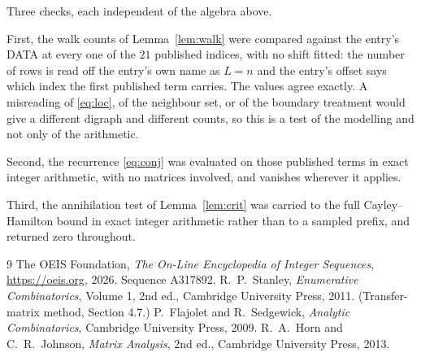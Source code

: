 \documentclass[11pt,a4paper]{article}
\theoremstyle{plain}
\theoremstyle{definition}
\begin{document}
Three checks, each independent of the algebra above.

First, the walk counts of Lemma~\ref{lem:walk} were compared against the entry's DATA at
every one of the $21$ published indices, with no shift fitted: the number of rows is
read off the entry's own name as $L=n$ and the entry's offset says which index the first
published term carries. The values agree exactly. A misreading of \eqref{eq:loc}, of the
neighbour set, or of the boundary treatment would give a different digraph and different
counts, so this is a test of the modelling and not only of the arithmetic.

Second, the recurrence \eqref{eq:conj} was evaluated on those published terms in exact
integer arithmetic, with no matrices involved, and vanishes wherever it applies.

Third, the annihilation test of Lemma~\ref{lem:crit} was carried to the full
Cayley--Hamilton bound in exact integer arithmetic rather than to a sampled prefix, and
returned zero throughout.

\begin{thebibliography}{9}
 The OEIS Foundation, \emph{The On-Line Encyclopedia of Integer
Sequences}, \url{https://oeis.org}, 2026. Sequence A317892.
 R.~P.~Stanley, \emph{Enumerative Combinatorics}, Volume 1, 2nd ed.,
Cambridge University Press, 2011. (Transfer-matrix method, Section 4.7.)
 P.~Flajolet and R.~Sedgewick, \emph{Analytic Combinatorics}, Cambridge
University Press, 2009.
 R.~A.~Horn and C.~R.~Johnson, \emph{Matrix Analysis}, 2nd ed., Cambridge
University Press, 2013.
\end{thebibliography}
\end{document}
